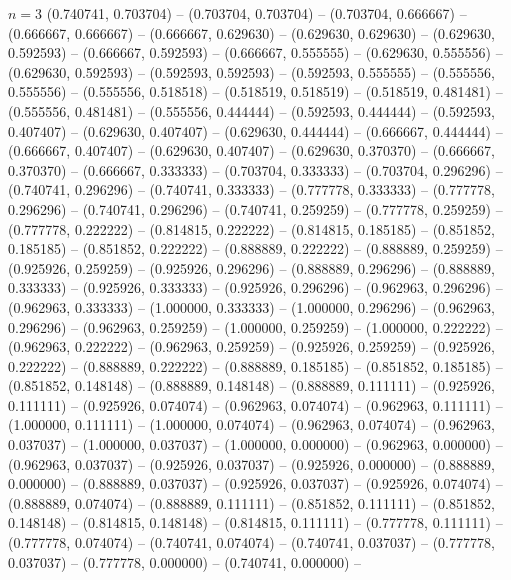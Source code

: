\begin{zzfrac}{$n = 3$}
  (0.740741, 0.703704) --
  (0.703704, 0.703704) --
  (0.703704, 0.666667) --
  (0.666667, 0.666667) --
  (0.666667, 0.629630) --
  (0.629630, 0.629630) --
  (0.629630, 0.592593) --
  (0.666667, 0.592593) --
  (0.666667, 0.555555) --
  (0.629630, 0.555556) --
  (0.629630, 0.592593) --
  (0.592593, 0.592593) --
  (0.592593, 0.555555) --
  (0.555556, 0.555556) --
  (0.555556, 0.518518) --
  (0.518519, 0.518519) --
  (0.518519, 0.481481) --
  (0.555556, 0.481481) --
  (0.555556, 0.444444) --
  (0.592593, 0.444444) --
  (0.592593, 0.407407) --
  (0.629630, 0.407407) --
  (0.629630, 0.444444) --
  (0.666667, 0.444444) --
  (0.666667, 0.407407) --
  (0.629630, 0.407407) --
  (0.629630, 0.370370) --
  (0.666667, 0.370370) --
  (0.666667, 0.333333) --
  (0.703704, 0.333333) --
  (0.703704, 0.296296) --
  (0.740741, 0.296296) --
  (0.740741, 0.333333) --
  (0.777778, 0.333333) --
  (0.777778, 0.296296) --
  (0.740741, 0.296296) --
  (0.740741, 0.259259) --
  (0.777778, 0.259259) --
  (0.777778, 0.222222) --
  (0.814815, 0.222222) --
  (0.814815, 0.185185) --
  (0.851852, 0.185185) --
  (0.851852, 0.222222) --
  (0.888889, 0.222222) --
  (0.888889, 0.259259) --
  (0.925926, 0.259259) --
  (0.925926, 0.296296) --
  (0.888889, 0.296296) --
  (0.888889, 0.333333) --
  (0.925926, 0.333333) --
  (0.925926, 0.296296) --
  (0.962963, 0.296296) --
  (0.962963, 0.333333) --
  (1.000000, 0.333333) --
  (1.000000, 0.296296) --
  (0.962963, 0.296296) --
  (0.962963, 0.259259) --
  (1.000000, 0.259259) --
  (1.000000, 0.222222) --
  (0.962963, 0.222222) --
  (0.962963, 0.259259) --
  (0.925926, 0.259259) --
  (0.925926, 0.222222) --
  (0.888889, 0.222222) --
  (0.888889, 0.185185) --
  (0.851852, 0.185185) --
  (0.851852, 0.148148) --
  (0.888889, 0.148148) --
  (0.888889, 0.111111) --
  (0.925926, 0.111111) --
  (0.925926, 0.074074) --
  (0.962963, 0.074074) --
  (0.962963, 0.111111) --
  (1.000000, 0.111111) --
  (1.000000, 0.074074) --
  (0.962963, 0.074074) --
  (0.962963, 0.037037) --
  (1.000000, 0.037037) --
  (1.000000, 0.000000) --
  (0.962963, 0.000000) --
  (0.962963, 0.037037) --
  (0.925926, 0.037037) --
  (0.925926, 0.000000) --
  (0.888889, 0.000000) --
  (0.888889, 0.037037) --
  (0.925926, 0.037037) --
  (0.925926, 0.074074) --
  (0.888889, 0.074074) --
  (0.888889, 0.111111) --
  (0.851852, 0.111111) --
  (0.851852, 0.148148) --
  (0.814815, 0.148148) --
  (0.814815, 0.111111) --
  (0.777778, 0.111111) --
  (0.777778, 0.074074) --
  (0.740741, 0.074074) --
  (0.740741, 0.037037) --
  (0.777778, 0.037037) --
  (0.777778, 0.000000) --
  (0.740741, 0.000000) --

\end{zzfrac}
